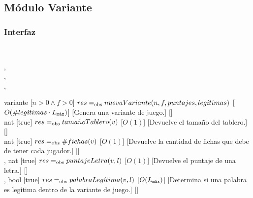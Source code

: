 \subsection{Módulo Variante}
\begin{interfaz}{\subsubsection{Interfaz}}
  \\
  \usa{\falta}
  \par\noindent
  \begin{operaciones}
    {
      \begin{adjustwidth}{2em}{}
      ,\\
      ,\\
      ,\\
      \end{adjustwidth}
    }{variante}
    [$n>0\land f>0$]
    {$res\igobs nuevaVariante(n,f,puntajes,leg\acute{\imath}timas)$}
    [$O(\#leg\acute{\imath}timas\cdot\Lmax)$]
    [Genera una variante de juego.]
    [\falta]\\

    \noindent{}
    {}{nat}
    [true]
    {$res\igobs tama\tilde{n}oTablero(v)$}
    [$O(1)$]
    [Devuelve el tamaño del tablero.]
    [\falta]\\

    \noindent{}
    {}{nat}
    [true]
    {$res\igobs \#fichas(v)$}
    [$O(1)$]
    [Devuelve la cantidad de fichas que debe de tener cada jugador.]
    [\falta]\\

    \noindent{}
    {, }{nat}
    [true]
    {$res\igobs puntajeLetra(v,l)$}
    [$O(1)$]
    [Devuelve el puntaje de una letra.]
    [\falta]\\

    \noindent{}
    {, }{bool}
    [true]
    {$res\igobs palabraLeg\acute{\imath}tima(v,l)$}
    [$O(\Lmax)$]
    [Determina si una palabra es legítima dentro de la variante de juego.]
    [\falta]\\


\end{operaciones}
\end{interfaz}
